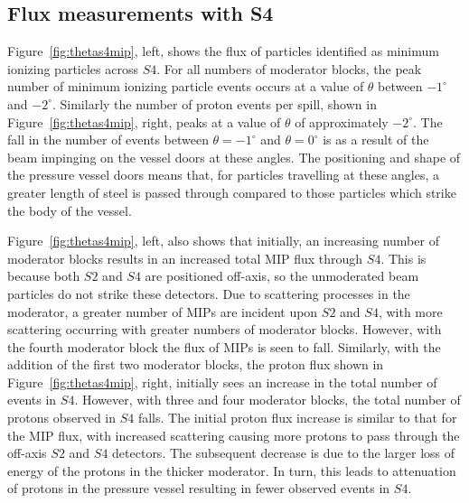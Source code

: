 \subsection{Flux measurements with S4}
\label{sec:s4Flux}

Figure~\ref{fig:thetas4mip}, left, shows the flux of particles identified as minimum ionizing particles across $\mathit{S4}$.
For all numbers of moderator blocks, the peak number of minimum ionizing particle events occurs at a value of $\theta$ between $-1^{\circ}$ and $-2^{\circ}$.
Similarly the number of proton events per spill, shown in Figure~\ref{fig:thetas4mip}, right, peaks at a value of $\theta$ of approximately $-2^{\circ}$.
The fall in the number of events between $\theta = -1^{\circ}$ and $\theta = 0^{\circ}$ is as a result of the beam impinging on the vessel doors at these angles.
The positioning and shape of the pressure vessel doors means that, for particles travelling at these angles, a greater length of steel is passed through compared to those particles which strike the body of the vessel.


Figure~\ref{fig:thetas4mip}, left, also shows that initially, an increasing number of moderator blocks results in an increased total MIP flux through $\mathit{S4}$. 
This is because both $\mathit{S2}$ and $\mathit{S4}$ are positioned off-axis, so the unmoderated beam particles do not strike these detectors.
Due to scattering processes in the moderator, a greater number of MIPs are incident upon $\mathit{S2}$ and $\mathit{S4}$, with more scattering occurring with greater numbers of moderator blocks.
However, with the fourth moderator block the flux of MIPs is seen to fall.
Similarly, with the addition of the first two moderator blocks, the proton flux shown in Figure~\ref{fig:thetas4mip}, right, initially sees an increase in the total number of events in $\mathit{S4}$.
However, with three and four moderator blocks, the total number of protons observed in $\mathit{S4}$ falls.
The initial proton flux increase is similar to that for the MIP flux, with increased scattering causing more protons to pass through the off-axis $\mathit{S2}$ and $\mathit{S4}$ detectors.
The subsequent decrease is due to the larger loss of energy of the protons in the thicker moderator.
In turn, this leads to attenuation of protons in the pressure vessel resulting in fewer observed events in $\mathit{S4}$.

